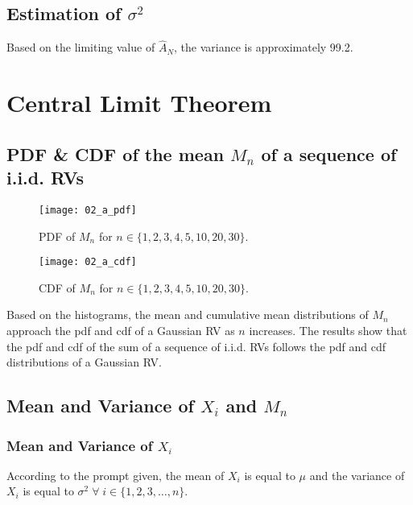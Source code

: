 \documentclass[12pt, a4paper, titlepage, fleqn]{article}
\begin{document}
\subsection{Estimation of $\sigma^2$}
Based on the limiting value of $\hat{A}_N$, the variance is approximately 99.2.

\pagebreak

\section{Central Limit Theorem}

\subsection{PDF \& CDF of the mean $M_n$ of a sequence of i.i.d. RVs}

\begin{figure}[h!]
	\centering
	\texttt{[image: 02\_a\_pdf]}
	\vspace{-24pt}
	\caption{PDF of $M_n$ for $n \in \{1,2,3,4,5,10,20,30\}$.} 
	\label{fig:mean pdf}
	\vspace{16pt}
	\texttt{[image: 02\_a\_cdf]}
	\vspace{-24pt}
	\caption{CDF of $M_n$ for $n \in \{1,2,3,4,5,10,20,30\}$.}
	\label{fig:mean cdf}
\end{figure}

\pagebreak

\begin{flushleft}
Based on the histograms, the mean and cumulative mean distributions of $M_n$ approach the pdf and cdf of a Gaussian RV as $n$ increases. The results show that the pdf and cdf of the sum of a sequence of i.i.d. RVs follows the pdf and cdf distributions of a Gaussian RV.
\end{flushleft}

\subsection{Mean and Variance of $X_i$ and $M_n$}

\subsubsection{Mean and Variance of $X_i$}
According to the prompt given, the mean of $X_i$ is equal to $\mu$ and the variance of $X_i$ is equal to $\sigma^2 \; \forall \; i \in \{1,2,3,\dots,n\}$.
\end{document}
